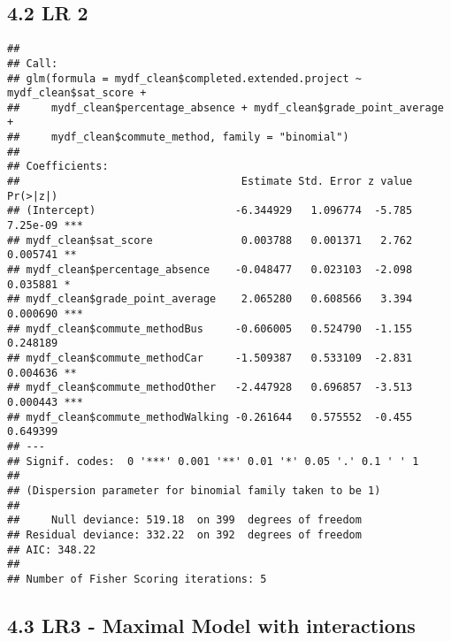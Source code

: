 \documentclass[
]{article}
\newenvironment{Shaded}{\begin{snugshade}}{\end{snugshade}}
\newcommand{\AttributeTok}[1]{\textcolor[rgb]{0.13,0.29,0.53}{#1}}
\newcommand{\FunctionTok}[1]{\textcolor[rgb]{0.13,0.29,0.53}{\textbf{#1}}}
\newcommand{\NormalTok}[1]{#1}
\newcommand{\OtherTok}[1]{\textcolor[rgb]{0.56,0.35,0.01}{#1}}
\newcommand{\SpecialCharTok}[1]{\textcolor[rgb]{0.81,0.36,0.00}{\textbf{#1}}}
\newcommand{\StringTok}[1]{\textcolor[rgb]{0.31,0.60,0.02}{#1}}
\begin{document}
\subsection{4.2 LR 2}\label{lr-2}

\begin{Shaded}
\end{Shaded}

\begin{verbatim}
## 
## Call:
## glm(formula = mydf_clean$completed.extended.project ~ mydf_clean$sat_score + 
##     mydf_clean$percentage_absence + mydf_clean$grade_point_average + 
##     mydf_clean$commute_method, family = "binomial")
## 
## Coefficients:
##                                   Estimate Std. Error z value Pr(>|z|)    
## (Intercept)                      -6.344929   1.096774  -5.785 7.25e-09 ***
## mydf_clean$sat_score              0.003788   0.001371   2.762 0.005741 ** 
## mydf_clean$percentage_absence    -0.048477   0.023103  -2.098 0.035881 *  
## mydf_clean$grade_point_average    2.065280   0.608566   3.394 0.000690 ***
## mydf_clean$commute_methodBus     -0.606005   0.524790  -1.155 0.248189    
## mydf_clean$commute_methodCar     -1.509387   0.533109  -2.831 0.004636 ** 
## mydf_clean$commute_methodOther   -2.447928   0.696857  -3.513 0.000443 ***
## mydf_clean$commute_methodWalking -0.261644   0.575552  -0.455 0.649399    
## ---
## Signif. codes:  0 '***' 0.001 '**' 0.01 '*' 0.05 '.' 0.1 ' ' 1
## 
## (Dispersion parameter for binomial family taken to be 1)
## 
##     Null deviance: 519.18  on 399  degrees of freedom
## Residual deviance: 332.22  on 392  degrees of freedom
## AIC: 348.22
## 
## Number of Fisher Scoring iterations: 5
\end{verbatim}

\subsection{4.3 LR3 - Maximal Model with
interactions}\label{lr3---maximal-model-with-interactions}
\end{document}

